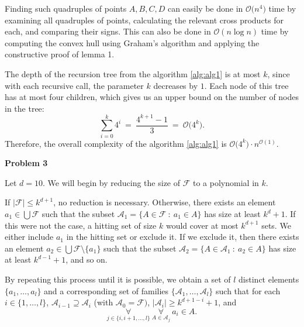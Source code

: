\documentclass[12pt]{article}
\begin{document}
	Finding such quadruples of points \(A, B, C, D\) can easily be done in
	\(\mathcal{O} \big( n^{4} \big)\) time by examining all quadruples of
	points, calculating the relevant cross products for each, and comparing
	their signs. This can also be done in \(\mathcal{O} (n \log n)\) time by
	computing the convex hull using Graham's algorithm and applying the
	constructive proof of lemma 1.
	
	\medskip
	
	The depth of the recursion tree from the algorithm \ref{alg:alg1} is at most
	\(k\), since with each recursive call, the parameter \(k\) decreases by
	\(1\). Each node of this tree has at most four children, which gives us an
	upper bound on the number of nodes in the tree:
	\[ \sum\limits_{i = 0}^{k} 4^{i} \ = \ \frac{4^{k + 1} - 1}{3} \ = \
	\mathcal{O} \big( 4^{k} \big) \text{.} \]
	Therefore, the overall complexity of the algorithm \ref{alg:alg1} is
	\(\mathcal{O} \big( 4^{k} \big) \cdot n^{\mathcal{O}(1)}\).
	
	\bigskip
	
	\textbf{Problem 3}
	
	\medskip
	
	Let \(d = 10\). We will begin by reducing the size of \(\mathcal{F}\) to a
	polynomial in \(k\).
	
	\medskip
	
	If \(|\mathcal{F}| \leqslant k^{d + 1}\), no reduction is necessary.
	Otherwise, there exists an element \(a_{1} \in \bigcup \mathcal{F}\) such
	that the subset \(\mathcal{A}_{1} = \{A \in \mathcal{F} \ : \ a_{1} \in
	A\}\) has size at least \(k^{d} + 1\). If this were not the case, a hitting
	set of size \(k\) would cover at most \(k^{d + 1}\) sets. We either include
	\(a_{1}\) in the hitting set or exclude it. If we exclude it, then there
	exists an element \(a_{2} \in \bigcup \mathcal{F} \setminus \{a_{1}\}\) such
	that the subset \(\mathcal{A}_{2} = \{A \in \mathcal{A}_{1} \ : \ a_{2} \in
	A\}\) has size at least \(k^{d - 1} + 1\), and so on.
	
	\medskip
	
	By repeating this process until it is possible, we obtain a set of \(l\)
	distinct elements \(\{a_{1}, \ldots, a_{l}\}\) and a corresponding set of
	families \(\{\mathcal{A}_{1}, \ldots, \mathcal{A}_{l}\}\) such that for each
	\(i \in \{1, \ldots, l\}\), \(\mathcal{A}_{i - 1} \supseteq
	\mathcal{A}_{i}\) (with \(\mathcal{A}_{0} = \mathcal{F})\),
	\(|\mathcal{A}_{i}| \geqslant k^{d + 1 - i} + 1\), and
	\[ \underset{j \in \{i, i + 1, \ldots, l\}}{\forall} \
	\underset{A \in \mathcal{A}_{j}}{\forall} \ a_{i} \in A \text{.} \]
	
\end{document}
